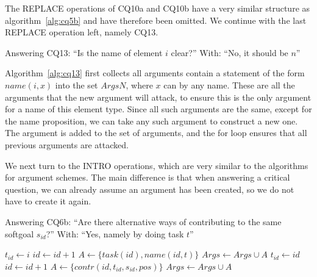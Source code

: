 The REPLACE operations of CQ10a and CQ10b have a very similar structure as algorithm~\ref{alg:cq5b} and have therefore been omitted. We continue with the last REPLACE operation left, namely CQ13.

\begin{algorithm}[h]
  \caption{Answering CQ13: ``Is the name of element $i$ clear?'' With: ``No, it should be $n$''}\label{alg:cq13}
\end{algorithm}

\rationale{} Algorithm~\ref{alg:cq13} first collects all arguments contain a statement of the form $name(i,x)$ into the set $ArgsN$, where $x$ can by any name. These are all the arguments that the new argument will attack, to ensure this is the only argument for a name of this element type. Since all such arguments are the same, except for the name proposition, we can take any such argument to construct a new one. The argument is added to the set of arguments, and the for loop ensures that all previous arguments are attacked.

We next turn to the INTRO operations, which are very similar to the algorithms for argument schemes. The main difference is that when answering a critical question, we can already assume an argument has been created, so we do not have to create it again.

\begin{algorithm}[h]
  \caption{Answering CQ6b: ``Are there alternative ways of contributing to the same softgoal $s_{id}$?'' With: ``Yes, namely by doing task $t$''}\label{alg:cq6b}
  \begin{algorithmic}[1]
        \State $t_{id} \gets i$
    \Else
      \State $id\gets id+1$
      \State $A \gets \{task(id),name(id,t)\}$
      \State $Args \gets Args\cup A$
      \State $t_{id} \gets id$
    \EndIf
    \State $id\gets id+1$
    \State $A\gets \{contr(id, t_{id}, s_{id}, pos)\}$
    \State $Args \gets Args\cup A$
    \EndProcedure
  \end{algorithmic}
\end{algorithm}

